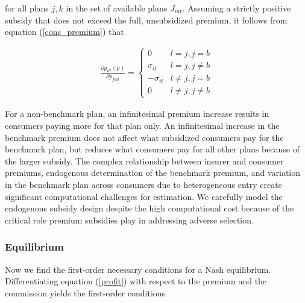 \documentclass[12pt]{article}
\begin{document}
	\vspace{-0.1in}		

\noindent for all plans $j,k$ in the set of available plans $J_{mt}$.  Assuming a strictly positive subsidy that does not exceed the full, unsubsidized premium, it follows from equation (\ref{cons_premium}) that

	\vspace{-0.4in}
	\singlespacing
	
	\begin{eqnarray}\label{price_partial_formula}
	 \frac{\partial p_{ilt}(\textit{p})}{\partial p_{jmt}} = \begin{cases} 
		0 & l=j, j = b \\		
		\sigma_{it} & l = j, j \neq b \\     
		-\sigma_{it} & l \neq j, j = b \\
		0 & l \neq j, j \neq b  
      
   \end{cases}
	\end{eqnarray}

	\doublespacing


\noindent For a non-benchmark plan, an infinitesimal premium increase results in consumers paying more for that plan only.  An infinitesimal increase in the benchmark premium does not affect what subsidized consumers pay for the benchmark plan, but reduces what consumers pay for all other plans because of the larger subsidy. The complex relationship between insurer and consumer premiums, endogenous determination of the benchmark premium, and variation in the benchmark plan across consumers due to heterogeneous entry create significant computational challenges for estimation.  We carefully model the endogenous subsidy design despite the high computational cost because of the critical role premium subsidies play in addressing adverse selection.  



\subsubsection{Equilibrium}


Now we find the first-order necessary conditions for a Nash equilibrium.  Differentiating equation (\ref{profit}) with respect to the premium and the commission yields the  first-order conditions  
\end{document}
